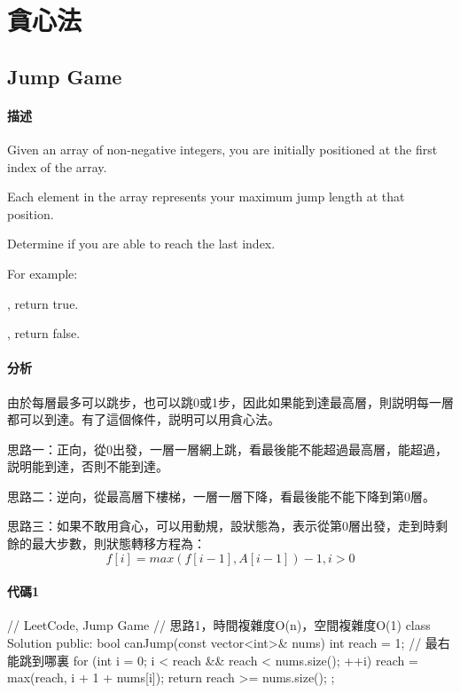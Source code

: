 \chapter{貪心法}


\section{Jump Game} %
\label{sec:jump-game}


\subsubsection{描述}
Given an array of non-negative integers, you are initially positioned at the first index of the array.

Each element in the array represents your maximum jump length at that position.

Determine if you are able to reach the last index.

For example:

, return true.

, return false.


\subsubsection{分析}
由於每層最多可以跳步，也可以跳0或1步，因此如果能到達最高層，則説明每一層都可以到達。有了這個條件，説明可以用貪心法。

思路一：正向，從0出發，一層一層網上跳，看最後能不能超過最高層，能超過，説明能到達，否則不能到達。

思路二：逆向，從最高層下樓梯，一層一層下降，看最後能不能下降到第0層。

思路三：如果不敢用貪心，可以用動規，設狀態為，表示從第0層出發，走到時剩餘的最大步數，則狀態轉移方程為：
$$
f[i] = max(f[i-1], A[i-1])-1, i > 0
$$


\subsubsection{代碼1}
\begin{Code}
// LeetCode, Jump Game
// 思路1，時間複雜度O(n)，空間複雜度O(1)
class Solution {
public:
    bool canJump(const vector<int>& nums) {
        int reach = 1; // 最右能跳到哪裏
        for (int i = 0; i < reach && reach < nums.size(); ++i)
            reach = max(reach,  i + 1 + nums[i]);
        return reach >= nums.size();
    }
};
\end{Code}


